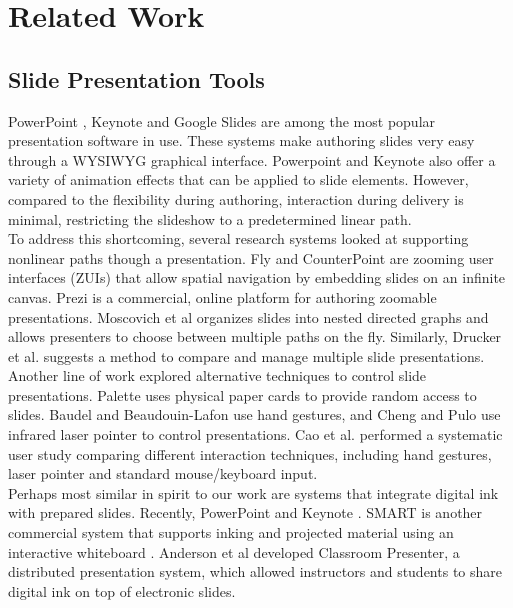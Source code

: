 \section{Related Work}
\subsection{Slide Presentation Tools}
PowerPoint \cite{powerpoint2017}, Keynote \cite{keynote2017} and Google Slides \cite{googleslides2017} are among the most popular presentation software in use. These systems make authoring slides very easy through a WYSIWYG graphical interface. Powerpoint and Keynote also offer a variety of animation effects that can be applied to slide elements. However, compared to the flexibility during authoring, interaction during delivery is minimal, restricting the slideshow to a predetermined linear path. \\
To address this shortcoming, several research systems looked at supporting nonlinear paths though a presentation. Fly \cite{lichtschlag2009fly} and CounterPoint \cite{good2002zoomable} are zooming user interfaces (ZUIs) that allow spatial navigation by embedding slides on an infinite canvas. Prezi \cite{prezi2017} is a commercial, online platform for authoring zoomable presentations. Moscovich et al \cite{moscovich2004customizable} organizes slides into nested directed graphs and allows presenters to choose between multiple paths on the fly. Similarly, Drucker et al. \cite{drucker2006comparing} suggests a method to compare and manage multiple slide presentations. \\
Another line of work explored alternative techniques to control slide presentations. Palette \cite{nelson1999palette} uses physical paper cards to provide random access to slides.  Baudel and Beaudouin-Lafon \cite{baudel1993charade} use hand gestures, and Cheng and Pulo \cite{cheng2003direct} use infrared laser pointer to control presentations. Cao et al. \cite{cao2005evaluation}
performed a systematic user study comparing different interaction techniques, including hand gestures, laser pointer and standard mouse/keyboard input. \\
Perhaps most similar in spirit to our work are systems that integrate digital ink with prepared slides. Recently, PowerPoint and Keynote  . SMART is another commercial system that supports inking and projected material using an interactive whiteboard \cite{smarttech2017}. Anderson et al \cite{anderson2007classroom} developed Classroom Presenter, a distributed presentation system, which allowed instructors and students to share digital ink on top of
electronic slides. 

